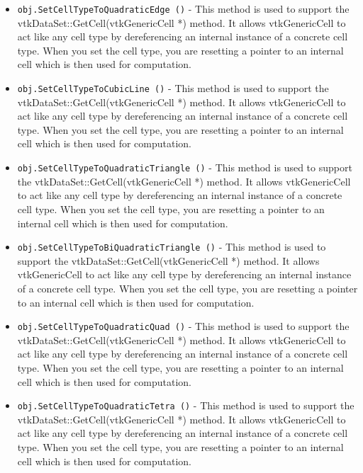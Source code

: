 \begin{itemize}
\item  \verb|obj.SetCellTypeToQuadraticEdge ()| -  This method is used to support the vtkDataSet::GetCell(vtkGenericCell *)
 method. It allows vtkGenericCell to act like any cell type by
 dereferencing an internal instance of a concrete cell type. When
 you set the cell type, you are resetting a pointer to an internal
 cell which is then used for computation.

\item  \verb|obj.SetCellTypeToCubicLine ()| -  This method is used to support the vtkDataSet::GetCell(vtkGenericCell *)
 method. It allows vtkGenericCell to act like any cell type by
 dereferencing an internal instance of a concrete cell type. When
 you set the cell type, you are resetting a pointer to an internal
 cell which is then used for computation.

\item  \verb|obj.SetCellTypeToQuadraticTriangle ()| -  This method is used to support the vtkDataSet::GetCell(vtkGenericCell *)
 method. It allows vtkGenericCell to act like any cell type by
 dereferencing an internal instance of a concrete cell type. When
 you set the cell type, you are resetting a pointer to an internal
 cell which is then used for computation.

\item  \verb|obj.SetCellTypeToBiQuadraticTriangle ()| -  This method is used to support the vtkDataSet::GetCell(vtkGenericCell *)
 method. It allows vtkGenericCell to act like any cell type by
 dereferencing an internal instance of a concrete cell type. When
 you set the cell type, you are resetting a pointer to an internal
 cell which is then used for computation.

\item  \verb|obj.SetCellTypeToQuadraticQuad ()| -  This method is used to support the vtkDataSet::GetCell(vtkGenericCell *)
 method. It allows vtkGenericCell to act like any cell type by
 dereferencing an internal instance of a concrete cell type. When
 you set the cell type, you are resetting a pointer to an internal
 cell which is then used for computation.

\item  \verb|obj.SetCellTypeToQuadraticTetra ()| -  This method is used to support the vtkDataSet::GetCell(vtkGenericCell *)
 method. It allows vtkGenericCell to act like any cell type by
 dereferencing an internal instance of a concrete cell type. When
 you set the cell type, you are resetting a pointer to an internal
 cell which is then used for computation.


\end{itemize}
